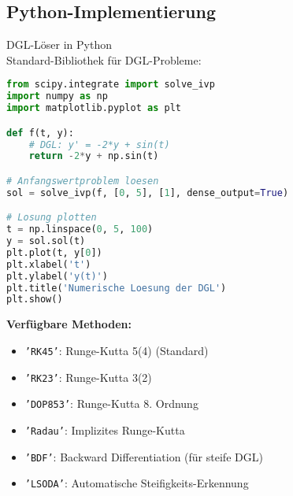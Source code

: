 \subsection{Python-Implementierung}

\begin{code}{DGL-Löser in Python}\\
Standard-Bibliothek für DGL-Probleme:
\begin{lstlisting}[language=Python, style=basesmol]
from scipy.integrate import solve_ivp
import numpy as np
import matplotlib.pyplot as plt

def f(t, y):
    # DGL: y' = -2*y + sin(t)
    return -2*y + np.sin(t)

# Anfangswertproblem loesen
sol = solve_ivp(f, [0, 5], [1], dense_output=True)

# Losung plotten
t = np.linspace(0, 5, 100)
y = sol.sol(t)
plt.plot(t, y[0])
plt.xlabel('t')
plt.ylabel('y(t)')
plt.title('Numerische Loesung der DGL')
plt.show()
\end{lstlisting}

\textbf{Verfügbare Methoden:}
\begin{itemize}
    \item \texttt{'RK45'}: Runge-Kutta 5(4) (Standard)
    \item \texttt{'RK23'}: Runge-Kutta 3(2)
    \item \texttt{'DOP853'}: Runge-Kutta 8. Ordnung
    \item \texttt{'Radau'}: Implizites Runge-Kutta
    \item \texttt{'BDF'}: Backward Differentiation (für steife DGL)
    \item \texttt{'LSODA'}: Automatische Steifigkeits-Erkennung
\end{itemize}
\end{code}

